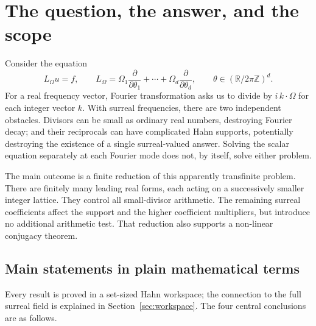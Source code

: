 \documentclass[11pt,letterpaper]{article}
\theoremstyle{definition}
\theoremstyle{remark}
\newcommand{\R}{\mathbb R}
\newcommand{\Z}{\mathbb Z}
\newcommand{\Lom}{L_{\Omega}}
\numberwithin{equation}{section}
\begin{document}
{\small\setlength{\parskip}{0pt}\tableofcontents}
\newpage

\section{The question, the answer, and the scope}
\label{sec:intro}

Consider the equation
\begin{equation}\label{eq:cohom-intro}
 \Lom u=f,\qquad
 \Lom=\Omega_1\frac{\partial}{\partial\theta_1}
       +\cdots+\Omega_d\frac{\partial}{\partial\theta_d},
 \qquad \theta\in(\R/2\pi\Z)^d.
\end{equation}
For a real frequency vector, Fourier transformation asks us to divide by
$i\,k\cdot\Omega$ for each integer vector $k$.  With surreal frequencies,
there are two independent obstacles.  Divisors can be small as ordinary real
numbers, destroying Fourier decay; and their reciprocals can have complicated
Hahn supports, potentially destroying the existence of a single surreal-valued
answer.  Solving the scalar equation separately at each Fourier mode does not,
by itself, solve either problem.

The main outcome is a finite reduction of this apparently transfinite
problem.  There are finitely many leading real forms, each acting on a
successively smaller integer lattice.  They control all small-divisor
arithmetic.  The remaining surreal coefficients affect the support and the
higher coefficient multipliers, but introduce no additional arithmetic test.
That reduction also supports a non-linear conjugacy theorem.

\subsection{Main statements in plain mathematical terms}

Every result is proved in a set-sized Hahn workspace; the connection to the
full surreal field is explained in Section~\ref{sec:workspace}.
The four central conclusions are as follows.
\end{document}
